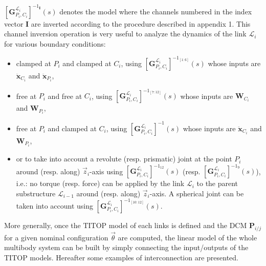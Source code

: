 \documentclass[smallcondensed]{svjour3}     %
\begin{document}
$\left[\mathbf{G}_{P_i,C_i}^{\mathcal{L}_i}\right]^{-1_\mathbf{I}}(s)$ denotes the model where the channels numbered in the index vector $\mathbf{I}$ are inverted according to the procedure described in appendix 1. This channel inversion operation is very useful to analyze the dynamics of the link $\mathcal{L}_i$ for various boundary conditions:
\begin{itemize}
\item clamped at $P_i$ and clamped at $C_i$, using $\left[\mathbf{G}_{P_i,C_i}^{\mathcal{L}_i}\right]^{-1_{[1:6]}}(s)$ whose inputs are $\ddot{\mathbf{x}}_{C_i}$ and $\ddot{\mathbf{x}}_{P_i}$,
\item free at $P_i$ and free at $C_i$, using $\left[\mathbf{G}_{P_i,C_i}^{\mathcal{L}_i}\right]^{-1_{[7:12]}}(s)$ whose inputs are $\mathbf{W}_{C_i}$ and $\mathbf{W}_{P_i}$,
\item free at $P_i$ and clamped at $C_i$, using $\left[\mathbf{G}_{P_i,C_i}^{\mathcal{L}_i}\right]^{-1}(s)$ whose inputs are $\ddot{\mathbf{x}}_{C_i}$ and $\mathbf{W}_{P_i}$,
\item or to take into account a revolute (resp. prismatic) joint at the point $P_i$ around (resp. along) $\vec{z}_i$-axis using $\left[\mathbf{G}_{P_i,C_i}^{\mathcal{L}_i}\right]^{-1_{12}}(s)$ (resp. $\left[\mathbf{G}_{P_i,C_i}^{\mathcal{L}_i}\right]^{-1_{9}}(s)$), i.e.: no torque (resp. force) can be applied by the link $\mathcal{L}_i$ to the parent substructure $\mathcal{L}_{i-1}$ around (resp. along) $\vec{z}_i$-axis. A spherical joint can be taken into account using $\left[\mathbf{G}_{P_i,C_i}^{\mathcal{L}_i}\right]^{-1_{[10:12]}}(s)$.
\end{itemize}

More generally, once the TITOP model of each links is defined and the DCM $\mathbf{P}_{i/j}$ for a given nominal configuration $\vec{\theta}$ are computed,  the linear model of the whole multibody system can be built by simply connecting the input/outputs of the TITOP models. Hereafter some examples of interconnection are presented.
\end{document}

